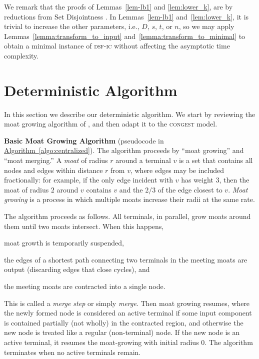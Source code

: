 \documentclass[letterpaper,11pt]{article}
\newcommand{\namedref}[2]{\hyperref[#2]{#1~\ref*{#2}}}
\newcommand{\algref}[1]{\namedref{Algorithm}{#1}}
\newcommand{\Congest}{\textsc{congest}\xspace}
\newcommand{\sfic}{\textsc{dsf-ic}\xspace}
\renewcommand{\paragraph}[1]{\smallskip\par\noindent\textbf{#1}}
\begin{document}
We remark that the proofs of Lemmas~\ref{lem-lb1} and  \ref{lem:lower_k},
are by reductions from Set Disjointness
\cite{KushilevitzN-book}.
In Lemmas~\ref{lem-lb1} and~\ref{lem:lower_k}, it is trivial to increase the
other parameters, i.e., $D$, $s$, $t$, or $n$, so we may apply
Lemmas~\ref{lemma:transform_to_input} and~\ref{lemma:transform_to_minimal} to
obtain a minimal instance of \sfic without affecting the asymptotic time
complexity.

\section{Deterministic Algorithm}
\label{sec-alg1}
In this section we describe our deterministic algorithm. We start by
reviewing the moat growing algorithm of \cite{AgrawalKR-95}, and then
adapt it to the \Congest model.

\paragraph{Basic Moat Growing Algorithm}
(pseudocode  
 in \algref{algo:centralized}). The algorithm proceeds by 
``moat growing'' and ``moat merging.'' 
A \emph{moat} of radius $r$ around a terminal
$v$ is a set that contains all
nodes and edges within distance $r$ from $v$, where edges may be
included fractionally: for example, if the only edge
incident with $v$ has 
weight $3$, then the moat of radius $2$ around $v$ contains $v$ and the 
$2/3$ of the edge closest to $v$. 
\emph{Moat growing} is a process in which multiple moats
increase their radii at the same rate. 

The algorithm proceeds as follows. All terminals, in parallel, grow moats around
them until two moats intersect. When this happens, 
\begin{inparaenum}[(1)]
\item moat growth is temporarily suspended,
\item the edges of a shortest path connecting two terminals in the meeting moats
are output (discarding edges that close cycles), and
\item the meeting  moats are contracted into a single node. 
\end{inparaenum}
This is called a \emph{merge step} or simply \emph{merge}. Then moat growing
resumes, where the newly formed node is considered an active terminal if some
input component is contained partially (not wholly) in the contracted region,
and otherwise the new node is treated like a regular (non-terminal) node. If the
new node is an active terminal, it resumes the moat-growing with initial radius
$0$. The algorithm terminates when no active terminals remain.
\end{document}
